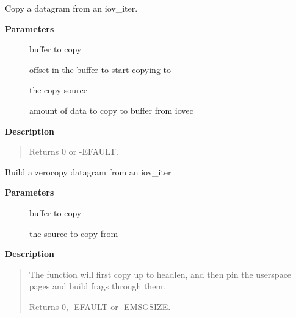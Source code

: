 \documentclass[a4paper,8pt,english]{sphinxmanual}
\begin{document}
\begin{fulllineitems}
\label{networking/kapi:c.skb_copy_datagram_from_iter}
Copy a datagram from an iov\_iter.

\end{fulllineitems}


\textbf{Parameters}
\begin{description}
\item[{}] \leavevmode
buffer to copy

\item[{}] \leavevmode
offset in the buffer to start copying to

\item[{}] \leavevmode
the copy source

\item[{}] \leavevmode
amount of data to copy to buffer from iovec

\end{description}

\textbf{Description}
\begin{quote}

Returns 0 or -EFAULT.
\end{quote}

\begin{fulllineitems}
\label{networking/kapi:c.zerocopy_sg_from_iter}
Build a zerocopy datagram from an iov\_iter

\end{fulllineitems}


\textbf{Parameters}
\begin{description}
\item[{}] \leavevmode
buffer to copy

\item[{}] \leavevmode
the source to copy from

\end{description}

\textbf{Description}
\begin{quote}

The function will first copy up to headlen, and then pin the userspace
pages and build frags through them.

Returns 0, -EFAULT or -EMSGSIZE.
\end{quote}
\end{document}
